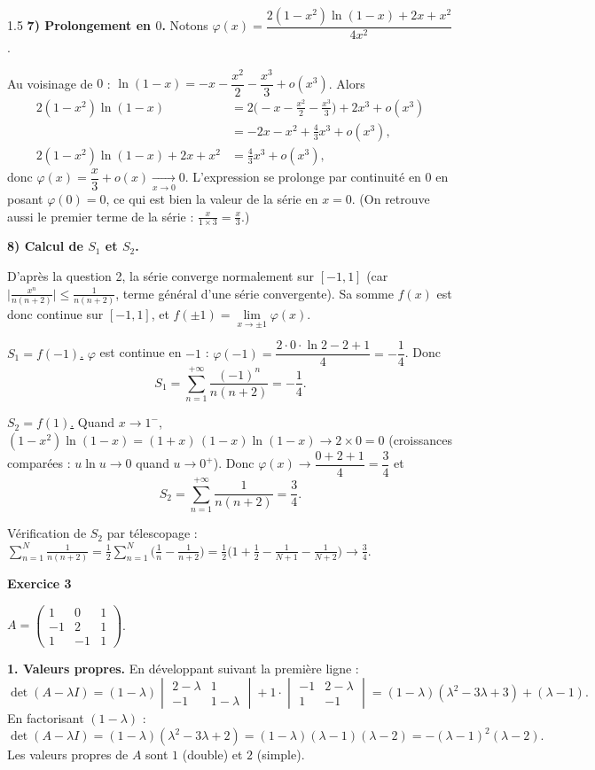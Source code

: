 \documentclass[12pt]{article}
\begin{document}
\begin{spacing}{1.5}
\textbf{7) Prolongement en $0$.} Notons $\varphi(x)=\dfrac{2(1-x^2)\ln(1-x)+2x+x^2}{4x^2}$.


Au voisinage de $0$ : $\ln(1-x)=-x-\dfrac{x^2}{2}-\dfrac{x^3}{3}+o(x^3)$. Alors
\begin{align*}
2(1-x^2)\ln(1-x)&=2\Big(-x-\frac{x^2}{2}-\frac{x^3}{3}\Big)+2x^3+o(x^3)\\&=-2x-x^2+\frac43x^3+o(x^3),\\
2(1-x^2)\ln(1-x)+2x+x^2&=\frac43x^3+o(x^3),
\end{align*}
donc $\varphi(x)=\dfrac x3+o(x)\xrightarrow[x\to0]{}0$. L'expression se prolonge par continuité en $0$ en posant $\varphi(0)=0$, ce qui est bien la valeur de la série en $x=0$. (On retrouve aussi le premier terme de la série : $\frac{x}{1\times3}=\frac x3$.)

\textbf{8) Calcul de $S_1$ et $S_2$.}

D'après la question 2, la série converge normalement sur $[-1,1]$ (car $\big|\frac{x^n}{n(n+2)}\big|\le\frac1{n(n+2)}$, terme général d'une série convergente). Sa somme $f(x)$ est donc continue sur $[-1,1]$, et $f(\pm1)=\lim\limits_{x\to\pm1}\varphi(x)$.

\underline{$S_1=f(-1)$.} $\varphi$ est continue en $-1$ : $\varphi(-1)=\dfrac{2\cdot0\cdot\ln2-2+1}{4}=-\dfrac14$. Donc
\[
\boxed{S_1=\sum_{n=1}^{+\infty}\frac{(-1)^n}{n(n+2)}=-\frac14}.
\]

\underline{$S_2=f(1)$.} Quand $x\to1^-$, $(1-x^2)\ln(1-x)=(1+x)\,(1-x)\ln(1-x)\to2\times0=0$ (croissances comparées : $u\ln u\to0$ quand $u\to0^+$). Donc $\varphi(x)\to\dfrac{0+2+1}{4}=\dfrac34$ et
\[
\boxed{S_2=\sum_{n=1}^{+\infty}\frac{1}{n(n+2)}=\frac34}.
\]

Vérification de $S_2$ par télescopage : $\displaystyle\sum_{n=1}^{N}\frac1{n(n+2)}=\frac12\sum_{n=1}^N\Big(\frac1n-\frac1{n+2}\Big)=\frac12\Big(1+\frac12-\frac1{N+1}-\frac1{N+2}\Big)\to\frac34$.

\medskip\textbf{Exercice 3}

$A=\begin{pmatrix}1&0&1\\-1&2&1\\1&-1&1\end{pmatrix}$.

\textbf{1. Valeurs propres.} En développant suivant la première ligne :
\[
\det(A-\lambda I)=(1-\lambda)\begin{vmatrix}2-\lambda&1\\-1&1-\lambda\end{vmatrix}+1\cdot\begin{vmatrix}-1&2-\lambda\\1&-1\end{vmatrix}
=(1-\lambda)(\lambda^2-3\lambda+3)+(\lambda-1).
\]
En factorisant $(1-\lambda)$ :
\[
\det(A-\lambda I)=(1-\lambda)(\lambda^2-3\lambda+2)=(1-\lambda)(\lambda-1)(\lambda-2)=-(\lambda-1)^2(\lambda-2).
\]
Les valeurs propres de $A$ sont $\boxed{1}$ (double) et $\boxed{2}$ (simple).


\end{spacing}
\end{document}
